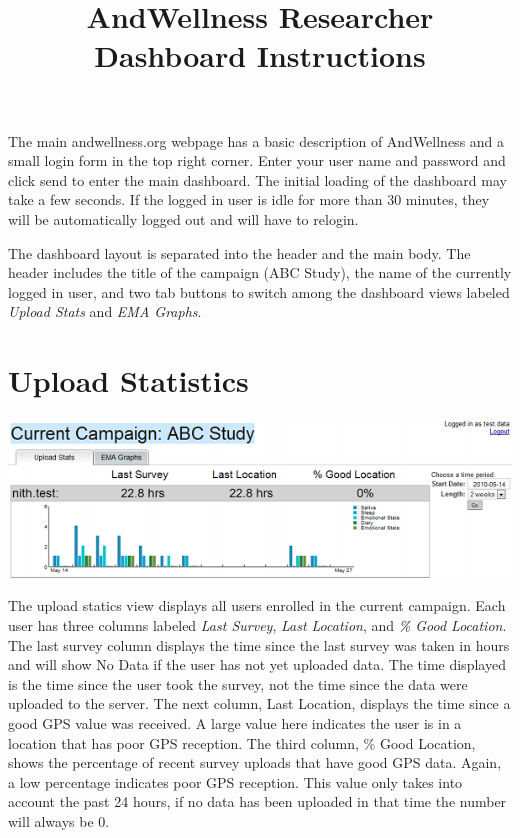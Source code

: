 \documentclass{article}
\title{AndWellness Researcher Dashboard Instructions}
\begin{document}
\maketitle

The main andwellness.org webpage has a basic description of AndWellness and a small
login form in the top right corner.  Enter your user name
and password and click send to enter the main dashboard.  The initial loading of the dashboard may take a few seconds.
If the logged in user is idle for more than 30 minutes, they will be automatically logged out and will have to relogin.

The dashboard layout is separated into the header and the main body.
The header includes the title of the campaign (ABC Study), the
name of the currently logged in user, and two tab buttons to switch among the
dashboard views labeled \emph{Upload Stats} and \emph{EMA Graphs}.

\section*{Upload Statistics}
\begin{center}
	\includegraphics[width=6in]{dashboard-shrunk}
\end{center}

The upload statics view displays all users enrolled in the current
campaign.  Each user has three columns labeled \emph{Last Survey},
\emph{Last Location}, and \emph{\% Good Location}.  The last survey column
displays the time since the last survey was taken in hours and
will show No Data if the user has not yet uploaded data.  The time displayed
is the time since the user took the survey, not the time since the data were uploaded to the server.
The next column, Last Location, displays the time since a good GPS value was received.  A large
value here indicates the user is in a location that has poor GPS reception.  The third column, \% Good Location,
shows the percentage of recent survey uploads that have good GPS data.  Again, a low percentage indicates
poor GPS reception.  This value only takes into account the past 24 hours, if no data has been uploaded in that
time the number will always be 0.
\end{document}
